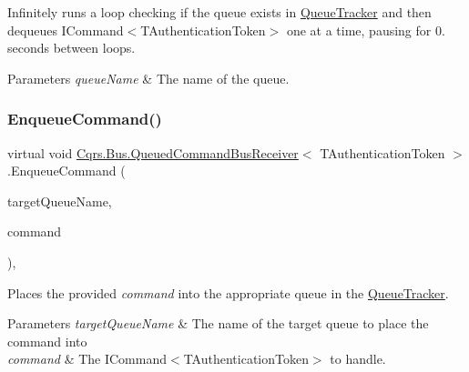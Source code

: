 Infinitely runs a loop checking if the queue exists in \hyperlink{classCqrs_1_1Bus_1_1QueuedCommandBusReceiver_a2fc62989429929acd8ea66808a8c4a78_a2fc62989429929acd8ea66808a8c4a78}{Queue\+Tracker} and then dequeues I\+Command$<$\+T\+Authentication\+Token$>$ one at a time, pausing for 0. seconds between loops. 


\begin{DoxyParams}{Parameters}
{\em queue\+Name} & The name of the queue.\\
\hline
\end{DoxyParams}
\mbox{\label{classCqrs_1_1Bus_1_1QueuedCommandBusReceiver_ab27ff7119814cdc22bf9a5811340e4e7_ab27ff7119814cdc22bf9a5811340e4e7}} 
\subsubsection{\texorpdfstring{Enqueue\+Command()}{EnqueueCommand()}}
{\footnotesize\ttfamily virtual void \hyperlink{classCqrs_1_1Bus_1_1QueuedCommandBusReceiver}{Cqrs.\+Bus.\+Queued\+Command\+Bus\+Receiver}$<$ T\+Authentication\+Token $>$.Enqueue\+Command (\begin{DoxyParamCaption}\item[{string}]{target\+Queue\+Name,  }\item[{\hyperlink{interfaceCqrs_1_1Commands_1_1ICommand}{I\+Command}$<$ T\+Authentication\+Token $>$}]{command }\end{DoxyParamCaption})\hspace{0.3cm}{\ttfamily [protected]}, {\ttfamily [virtual]}}



Places the provided {\itshape command}  into the appropriate queue in the \hyperlink{classCqrs_1_1Bus_1_1QueuedCommandBusReceiver_a2fc62989429929acd8ea66808a8c4a78_a2fc62989429929acd8ea66808a8c4a78}{Queue\+Tracker}. 


\begin{DoxyParams}{Parameters}
{\em target\+Queue\+Name} & The name of the target queue to place the command into\\
\hline
{\em command} & The I\+Command$<$\+T\+Authentication\+Token$>$ to handle.\\
\hline
\end{DoxyParams}
\mbox{\label{classCqrs_1_1Bus_1_1QueuedCommandBusReceiver_aad9ab381afcc8346479ab9cabdf1046a_aad9ab381afcc8346479ab9cabdf1046a}} 
